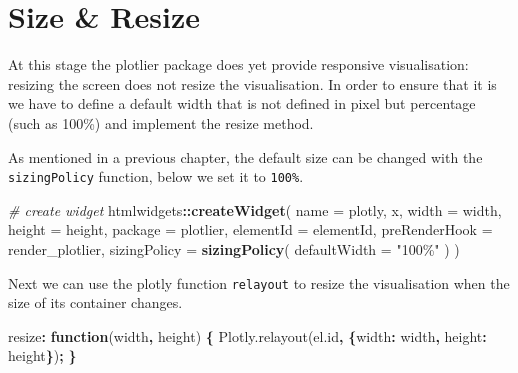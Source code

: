 \documentclass[
]{krantz}
\makeatletter
\newenvironment{Shaded}{\begin{snugshade}}{\end{snugshade}}
\newcommand{\AttributeTok}[1]{\textcolor[rgb]{0.61,0.61,0.61}{#1}}
\newcommand{\CommentTok}[1]{\textcolor[rgb]{0.37,0.37,0.37}{\textit{#1}}}
\newcommand{\DataTypeTok}[1]{\textcolor[rgb]{0.27,0.27,0.27}{#1}}
\newcommand{\KeywordTok}[1]{\textcolor[rgb]{0.27,0.27,0.27}{\textbf{#1}}}
\newcommand{\NormalTok}[1]{#1}
\newcommand{\OperatorTok}[1]{\textcolor[rgb]{0.43,0.43,0.43}{\textbf{#1}}}
\newcommand{\StringTok}[1]{\textcolor[rgb]{0.5,0.5,0.5}{#1}}
\newcommand{\VariableTok}[1]{\textcolor[rgb]{0,0,0}{#1}}
\newenvironment{kframe}{%
\medskip{}
\setlength{\fboxsep}{.8em}
 \def\at@end@of@kframe{}%
 \ifinner\ifhmode%
  \def\at@end@of@kframe{\end{minipage}}%
  \begin{minipage}{\columnwidth}%
 \fi\fi%
 \def\FrameCommand##1{\hskip\@totalleftmargin \hskip-\fboxsep
 \colorbox{shadecolor}{##1}\hskip-\fboxsep
     \hskip-\linewidth \hskip-\@totalleftmargin \hskip\columnwidth}%
 \MakeFramed {\advance\hsize-\width
   \@totalleftmargin\z@ \linewidth\hsize
   \@setminipage}}%
 {\par\unskip\endMakeFramed%
 \at@end@of@kframe}
\renewenvironment{Shaded}{\begin{kframe}}{\end{kframe}}
\makeatother
\begin{document}
\hypertarget{size-resize}{%
\section{Size \& Resize}\label{size-resize}}

At this stage the plotlier package does yet provide responsive visualisation: resizing the screen does not resize the visualisation. In order to ensure that it is we have to define a default width that is not defined in pixel but percentage (such as 100\%) and implement the resize method.

As mentioned in a previous chapter, the default size can be changed with the \texttt{sizingPolicy} function, below we set it to \texttt{100\%}.

\begin{Shaded}
\begin{Highlighting}[]
\CommentTok{\# create widget}
\NormalTok{htmlwidgets}\OperatorTok{::}\KeywordTok{createWidget}\NormalTok{(}
  \DataTypeTok{name =} \StringTok{\textquotesingle{}plotly\textquotesingle{}}\NormalTok{,}
\NormalTok{  x,}
  \DataTypeTok{width =}\NormalTok{ width,}
  \DataTypeTok{height =}\NormalTok{ height,}
  \DataTypeTok{package =} \StringTok{\textquotesingle{}plotlier\textquotesingle{}}\NormalTok{,}
  \DataTypeTok{elementId =}\NormalTok{ elementId,}
  \DataTypeTok{preRenderHook =}\NormalTok{ render\_plotlier,}
  \DataTypeTok{sizingPolicy =} \KeywordTok{sizingPolicy}\NormalTok{(}
    \DataTypeTok{defaultWidth =} \StringTok{"100\%"}
\NormalTok{  )}
\NormalTok{)}
\end{Highlighting}
\end{Shaded}

Next we can use the plotly function \texttt{relayout} to resize the visualisation when the size of its container changes.

\begin{Shaded}
\begin{Highlighting}[]
\NormalTok{resize}\OperatorTok{:} \KeywordTok{function}\NormalTok{(width}\OperatorTok{,}\NormalTok{ height) }\OperatorTok{\{}
  \VariableTok{Plotly}\NormalTok{.}\AttributeTok{relayout}\NormalTok{(}\VariableTok{el}\NormalTok{.}\AttributeTok{id}\OperatorTok{,} \OperatorTok{\{}\DataTypeTok{width}\OperatorTok{:}\NormalTok{ width}\OperatorTok{,} \DataTypeTok{height}\OperatorTok{:}\NormalTok{ height}\OperatorTok{\}}\NormalTok{)}\OperatorTok{;}
\OperatorTok{\}}
\end{Highlighting}
\end{Shaded}
\end{document}
